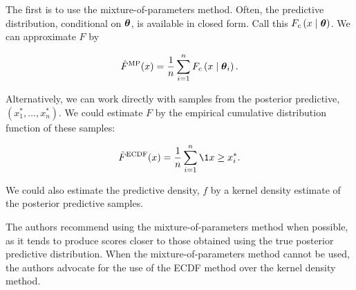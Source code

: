 The first is to use the mixture-of-parameters method.
Often, the predictive distribution, conditional on \( \boldsymbol{\theta} \), is available in closed form.
Call this \( F_c \left( x \mid \boldsymbol{\theta} \right) \).
We can approximate \( F \) by 

\begin{equation}
    \hat{F}^\mathrm{MP}(x) = \frac{1}{n} \sum_{i=1}^n F_c \left( x \mid \boldsymbol{\theta}_i \right).
\end{equation}

Alternatively, we can work directly with samples from the posterior predictive, \( \left( x^*_1, \ldots, x^*_n \right) \).
We could estimate \( F \) by the empirical cumulative distribution function of these samples:

\begin{equation}
    \hat{F}^\mathrm{ECDF}(x) = \frac{1}{n} \sum_{i=1}^n \1{x \geq x^*_i}.
\end{equation}

We could also estimate the predictive density, \( f \) by a kernel density estimate of the posterior predictive samples.

The authors recommend using the mixture-of-parameters method when possible, as it tends to produce scores closer to those obtained using the true posterior predictive distribution.
When the mixture-of-parameters method cannot be used, the authors advocate for the use of the ECDF method over the kernel density method.
